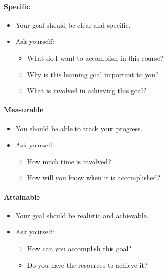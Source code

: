 \documentclass[
]{book}
\providecommand{\tightlist}{%
  \setlength{\itemsep}{0pt}\setlength{\parskip}{0pt}}
\begin{document}
\hypertarget{specific}{%
\paragraph*{Specific}\label{specific}}

\begin{itemize}
\tightlist
\item
  Your goal should be clear and specific.
\item
  Ask yourself:

  \begin{itemize}
  \tightlist
  \item
    What do I want to accomplish in this course?
  \item
    Why is this learning goal important to you?
  \item
    What is involved in achieving this goal?
  \end{itemize}
\end{itemize}

\hypertarget{measurable}{%
\paragraph*{Measurable}\label{measurable}}

\begin{itemize}
\tightlist
\item
  You should be able to track your progress.
\item
  Ask yourself:

  \begin{itemize}
  \tightlist
  \item
    How much time is involved?
  \item
    How will you know when it is accomplished?
  \end{itemize}
\end{itemize}

\hypertarget{attainable}{%
\paragraph*{Attainable}\label{attainable}}

\begin{itemize}
\tightlist
\item
  Your goal should be realistic and achievable.
\item
  Ask yourself:

  \begin{itemize}
  \tightlist
  \item
    How can you accomplish this goal?
  \item
    Do you have the resources to achieve it?
  \end{itemize}
\end{itemize}
\end{document}
